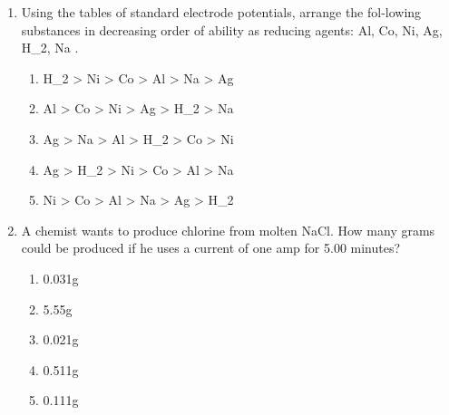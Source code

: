 \documentclass[12pt]{article}
\begin{document}
\begin{enumerate}[label=\arabic*.]
\begin{enumerate}[label=(\alph*)]
    \item 450 liters
    \item 100 liters
    \item 350 liters
    \item 150 liters
\end{enumerate}
\item Using the tables of standard electrode potentials, arrange the fol-lowing substances in
decreasing order of ability as reducing agents: Al, Co, Ni, Ag, H\_2, Na .
\begin{enumerate}[label=(\alph*)]
    \item H\_2 \textgreater{} Ni \textgreater{} Co \textgreater{} Al \textgreater{} Na \textgreater{} Ag
    \item Al \textgreater{} Co \textgreater{} Ni \textgreater{} Ag \textgreater{} H\_2 \textgreater{} Na
    \item Ag \textgreater{} Na \textgreater{} Al \textgreater{} H\_2 \textgreater{} Co \textgreater{} Ni
    \item Ag \textgreater{} H\_2 \textgreater{} Ni \textgreater{} Co \textgreater{} Al \textgreater{} Na
    \item Ni \textgreater{} Co \textgreater{} Al \textgreater{} Na \textgreater{} Ag \textgreater{} H\_2
\end{enumerate}
\item A chemist wants to produce chlorine from molten NaCl. How many grams could be produced if
he uses a current of one amp for 5.00 minutes?
\begin{enumerate}[label=(\alph*)]
    \item 0.031g
    \item 5.55g
    \item 0.021g
    \item 0.511g
    \item 0.111g
\end{enumerate}
\end{enumerate}
\end{document}

